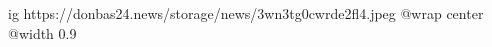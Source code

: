  
 
 
 
 

\ifcmt
  ig https://donbas24.news/storage/news/3wn3tg0cwrde2fl4.jpeg
  @wrap center
  @width 0.9
\fi
